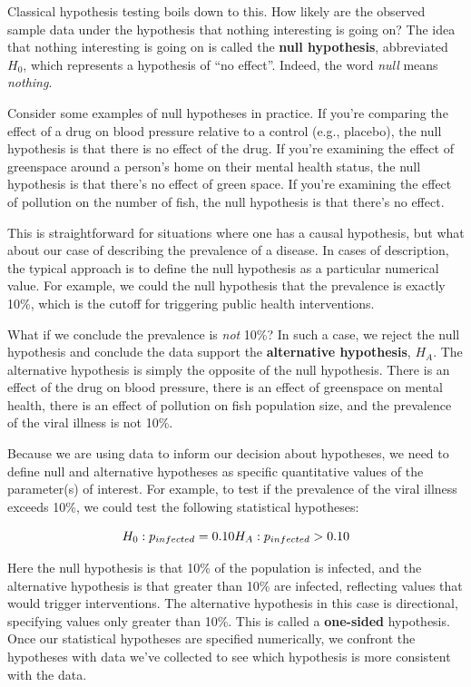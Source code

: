 \documentclass[
]{book}
\begin{document}
Classical hypothesis testing boils down to this. How likely are the observed sample data under the hypothesis that nothing interesting is going on? The idea that nothing interesting is going on is called the \textbf{null hypothesis}, abbreviated \(H_{0}\), which represents a hypothesis of ``no effect''. Indeed, the word \emph{null} means \emph{nothing}.

Consider some examples of null hypotheses in practice. If you're comparing the effect of a drug on blood pressure relative to a control (e.g., placebo), the null hypothesis is that there is no effect of the drug. If you're examining the effect of greenspace around a person's home on their mental health status, the null hypothesis is that there's no effect of green space. If you're examining the effect of pollution on the number of fish, the null hypothesis is that there's no effect.

This is straightforward for situations where one has a causal hypothesis, but what about our case of describing the prevalence of a disease. In cases of description, the typical approach is to define the null hypothesis as a particular numerical value. For example, we could the null hypothesis that the prevalence is exactly 10\%, which is the cutoff for triggering public health interventions.

What if we conclude the prevalence is \emph{not} 10\%? In such a case, we reject the null hypothesis and conclude the data support the \textbf{alternative hypothesis}, \(H_A\). The alternative hypothesis is simply the opposite of the null hypothesis. There is an effect of the drug on blood pressure, there is an effect of greenspace on mental health, there is an effect of pollution on fish population size, and the prevalence of the viral illness is not 10\%.

Because we are using data to inform our decision about hypotheses, we need to define null and alternative hypotheses as specific quantitative values of the parameter(s) of interest. For example, to test if the prevalence of the viral illness exceeds 10\%, we could test the following statistical hypotheses:

\[
H_0: p_{infected}=0.10 \\
H_A: p_{infected}>0.10
\]

Here the null hypothesis is that 10\% of the population is infected, and the alternative hypothesis is that greater than 10\% are infected, reflecting values that would trigger interventions. The alternative hypothesis in this case is directional, specifying values only greater than 10\%. This is called a \textbf{one-sided} hypothesis. Once our statistical hypotheses are specified numerically, we confront the hypotheses with data we've collected to see which hypothesis is more consistent with the data.
\end{document}
